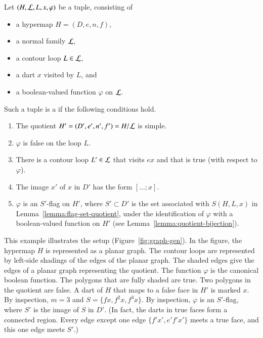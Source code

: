 \begin{definition}\label{def:marked}
Let $(H,{\cal L},L,x,\varphi)$ be a tuple, consisting of 
\begin{itemize}
\item a hypermap $H=(D,e,n,f)$, 
\item a
normal family ${\cal L}$, 
\item a contour loop $L\in{\cal L}$, 
\item a dart $x$ visited by $L$,
and 
\item a  boolean-valued function $\varphi$ on ${\cal L}$.
\end{itemize}
Such a tuple is a  if
the following conditions hold.
\begin{enumerate}
\item The quotient $H'=(D',e',n',f')=H/{\cal L}$ is simple.  
\item $\varphi$ is false on the loop $L$.
\item There is a contour loop $L'\in {\cal L}$ that visits $e x$ and that is true (with respect to
$\varphi$).
\item The image $x'$ of $x$ in $D'$ has the form $[\ldots;x]$.
\item 
  $\varphi$ is an $S'$-flag on $H'$, where $S'\subset D'$ is the set
  associated with $S(H,L,x)$ in Lemma~\ref{lemma:flag-set-quotient},
  under the identification of $\varphi$ with a boolean-valued
  function on $H'$ (see Lemma~\ref{lemma:quotient-bijection}).
\end{enumerate}
\end{definition}




\begin{example}[illustration]\label{ex:graph-gen}  
  This example illustrates the setup (Figure~\ref{fig:graph-gen}).  In
  the figure, the hypermap $H$ is represented as a planar graph.  The
  contour loops are represented by left-side shadings of the edges of
  the planar graph.  The shaded edges give the edges of a planar graph
  representing the quotient.  The function $\varphi$ is the canonical
  boolean function.  The polygons that are fully shaded are true.  Two
  polygons in the quotient are false.  A dart of $H$ that maps to a
  false face in $H'$ is marked $x$.  By inspection, $m=3$ and $S=\{f
  x,f^2 x,f^3 x\}$.  By inspection, $\varphi$ is an $S'$-flag, where
  $S'$ is the image of $S$ in $D'$.  (In fact, the darts in true faces
  form a connected region.  Every edge except one edge $\{f' x', e' f'
  x'\}$ meets a true face, and this one edge meets $S'$.)
\end{example}

